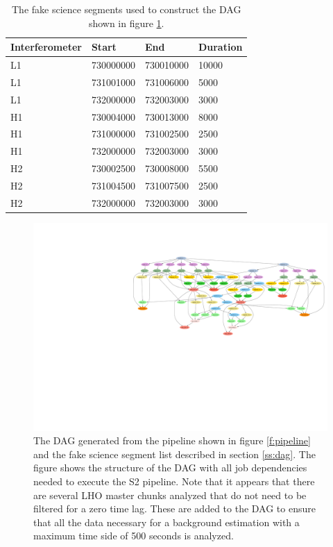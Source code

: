 \begin{table}[p]
\label{t:fakesegslist}
\begin{center}
\begin{tabular}{llll}
Interferometer&Start&End&Duration\\
\hline
L1 &  730000000 &730010000 &  10000  \\
L1 &  731001000 &731006000 &   5000  \\
L1 &  732000000 &732003000 &   3000  \\
\hline
H1 &  730004000 &730013000 &   8000  \\
H1 &  731000000 &731002500 &   2500  \\
H1 &  732000000 &732003000 &   3000  \\
\hline
H2 &  730002500 &730008000 &   5500  \\
H2 &  731004500 &731007500 &   2500  \\
H2 &  732000000 &732003000 &   3000
\end{tabular}
\end{center}
\caption[Fake Science Segments Used to Test DAG Generation]{
The fake science segments used to construct the DAG shown in figure
\ref{f:fake_segs_dag}.
}
\end{table}

\begin{figure}
\label{f:fake_segs_dag}
\begin{center}
\hspace*{-0.2in}\includegraphics[width=\linewidth]{figures/pipeline/fake_segs_dag}
\end{center}
\caption[DAG Generated from Fake Segments]{%
The DAG generated from the pipeline shown in figure \ref{f:pipeline} and the
fake science segment list described in section \ref{ss:dag}. The figure shows
the structure of the DAG with all job dependencies needed to execute the S2
pipeline. Note that it appears that there are several LHO master chunks
analyzed that do not need to be filtered for a zero time lag.  These are added
to the DAG to ensure that all the data necessary for a background estimation
with a maximum time side of 500 seconds is analyzed.
}
\end{figure}


